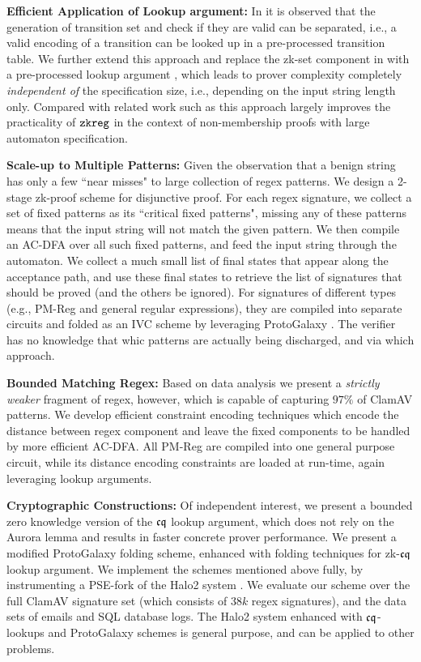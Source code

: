 {\bf Efficient Application of Lookup argument:}
In \cite{Zkreg} it is observed that the generation of transition set
and check if they are valid can be separated, i.e.,
a valid encoding of a transition can be looked up in a pre-processed
transition table. We further
extend this approach and replace the zk-set component in \cite{Zkreg}
with a pre-processed lookup argument \cite{cq}, which leads to
prover complexity completely {\em independent of} 
the specification size, i.e., depending on the input string
length only. Compared with related work such as
\cite{Zombie23,ZkMiddleBox,Luo23} this approach largely improves
the practicality of ${\tt zkreg }$ in the context of non-membership proofs
with large automaton specification.

{\bf Scale-up to Multiple Patterns:} Given the observation that
a benign string has only a few ``near misses" to large collection
of regex patterns. We design a 2-stage zk-proof scheme for
disjunctive proof. For each regex signature, we collect 
a set of fixed patterns as its ``critical fixed patterns",
missing any of these patterns means that the input string
will not match the given pattern. We then compile an AC-DFA
over all such fixed patterns, and feed the input string
through the automaton. We collect a much small list of
final states that appear along the acceptance path, and
use these final states to retrieve the list of signatures
that should be proved (and the others be ignored).
For signatures of different types (e.g., PM-Reg and
general regular expressions), they are compiled into separate
circuits and folded as an IVC scheme by leveraging
ProtoGalaxy \cite{ProtoGalaxy}. The verifier has no knowledge
that whic patterns are actually being discharged, and via
which approach.

{\bf Bounded Matching Regex:} Based on data analysis
we present a {\em strictly weaker} fragment of regex,
however, which is capable of capturing $97\%$ of
ClamAV patterns. We develop efficient constraint
encoding techniques which encode the distance between
regex component and leave the fixed components to be 
handled by more efficient AC-DFA. All PM-Reg are compiled
into one general purpose circuit, while its
distance encoding constraints are loaded at run-time,
again leveraging lookup arguments.

{\bf Cryptographic Constructions:} Of independent interest,
we present a bounded zero knowledge version of the
${\mathfrak{cq}}$ lookup argument, which does not rely on the
Aurora lemma \cite{aurora19} and results in faster concrete
prover performance.  We present a modified
ProtoGalaxy folding scheme, enhanced with
folding techniques for zk-${\mathfrak{cq}}$ lookup argument.
We implement the schemes mentioned above fully, by
instrumenting a PSE-fork of the Halo2 system \cite{Halo2}.
We evaluate our scheme
over the full ClamAV signature set (which consists of
$38k$ regex signatures), and the data sets of emails and SQL 
database logs. 
The Halo2 system enhanced with ${\mathfrak{cq}}$-lookups and ProtoGalaxy schemes
is general purpose, and can be applied to other problems.

